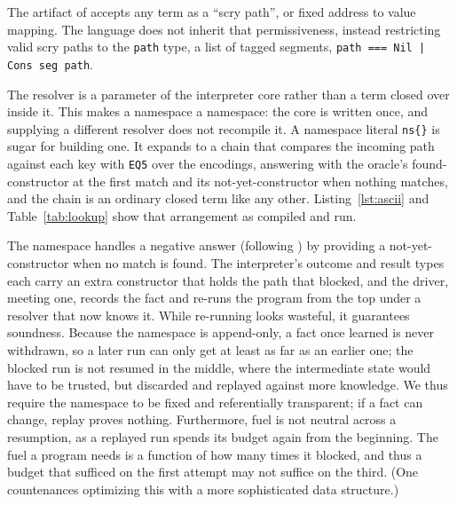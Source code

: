 \documentclass[english,submission,code=tt]{programming}
\begin{document}
The artifact of \citet{Davis2027} accepts any term as a ``scry path'',
or fixed address to value mapping.  The language does not inherit that
permissiveness, instead restricting valid scry paths to the
\texttt{path} type, a list of tagged segments,
\texttt{path === Nil | Cons seg path}. %

The resolver is a parameter of the interpreter core rather than a term
closed over inside it.  This makes a namespace a namespace: the
core is written once, and supplying a different resolver does not
recompile it.  A namespace literal \texttt{ns\{\}} is sugar for 
building one.  It expands to a chain that compares the incoming path 
against each key with \texttt{EQ5} over the encodings, answering with 
the oracle's found-constructor at the first match and its 
not-yet-constructor when nothing matches, and the chain is an ordinary 
closed term like any other.  Listing~\ref{lst:ascii} and
Table~\ref{tab:lookup} show that arrangement as compiled and run.

The namespace handles a negative answer (following \citet{Davis2027}) by providing a not-yet-constructor when no match is found.
The interpreter's outcome and 
result types each carry an extra constructor that holds the path that 
blocked, and the driver, meeting one, records the fact and re-runs the 
program from the top under a resolver that now knows it.  While 
re-running looks wasteful, it guarantees soundness.  
Because the namespace is append-only, a fact once learned is never 
withdrawn, so a later run can only get at least as far as an earlier 
one; the blocked run is not resumed in the middle, where the 
intermediate state would have to be trusted, but discarded and replayed 
against more knowledge.  We thus require the namespace to be fixed and
referentially transparent; if a fact can change, replay proves 
nothing.  Furthermore, fuel is not neutral across a resumption, as a
replayed run spends its budget again from the beginning. The fuel a
program needs is a function of how many times it blocked, and thus a 
budget that sufficed on the first attempt may not suffice on the third.
(One countenances optimizing this with a more sophisticated 
data structure.)
\end{document}
